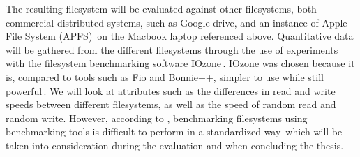 The resulting filesystem will be evaluated against other filesystems, both commercial distributed systems, such as Google drive, and an instance of Apple File System (APFS)\,\cite{appleAppleFileSystem} on the Macbook laptop referenced above. Quantitative data will be gathered from the different filesystems through the use of experiments with the filesystem benchmarking software IOzone\,\cite{IozoneFilesystemBenchmark}. IOzone was chosen because it is, compared to tools such as Fio and Bonnie++, simpler to use while still powerful\,\cite{agarwalComparingIOBenchmarks2018}. We will look at attributes such as the differences in read and write speeds between different filesystems, as well as the speed of random read and random write. However, according to \citeauthor{tarasovBenchmarkingFileSystem2011}, benchmarking filesystems using benchmarking tools is difficult to perform in a standardized way\,\cite{tarasovBenchmarkingFileSystem2011} which will be taken into consideration during the evaluation and when concluding the thesis.